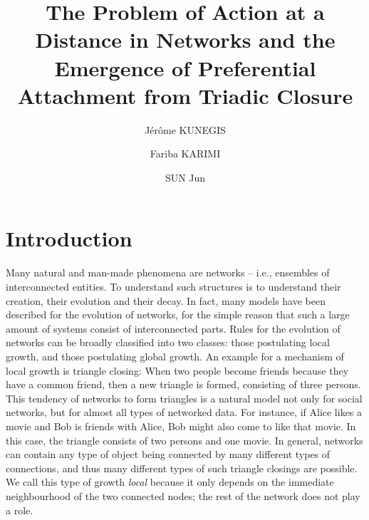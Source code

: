 \documentclass{jimis}
\title{ The Problem of Action at a Distance in Networks and the Emergence of Preferential Attachment from Triadic Closure }
\author[*1]{Jérôme KUNEGIS}
\author[1,2]{Fariba KARIMI}
\author[1]{SUN Jun}
\affil[1]{University of Koblenz--Landau, Germany}
\affil[2]{GESIS -- Leibniz-Institut für die Sozialwissenschaften, Germany}
\begin{document}
\maketitle

\linenumbers



\section{Introduction}
Many natural and man-made phenomena are networks -- i.e., ensembles of
interconnected entities.  To understand such structures is to understand
their creation, their evolution and their decay.  In fact, many models
have been described for the evolution of networks, for the simple reason
that such a large amount of systems consist of interconnected parts. 
Rules for the 
evolution of networks can be broadly classified into two classes: those
postulating local growth, and those postulating global growth.  An
example for a mechanism of local growth is triangle closing: When two
people become friends because they have a common friend, then a new
triangle is formed, consisting of three persons.  This tendency of
networks to form triangles is a natural model not only for social
networks, but for almost all types of networked data.  For instance, if
Alice likes a movie and Bob is friends with Alice, Bob might also come
to like that movie.  In this case, the triangle consists of two persons
and one movie.  In general, networks can contain any type of object
being connected by many different types of connections, and thus many
different types of such triangle closings are possible.  We call this
type of growth \emph{local} because it only depends on the immediate
neighbourhood of the two connected nodes; the rest of the network does
not play a role.
\end{document}
